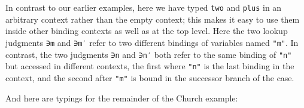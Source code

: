 \begin{fence}
\begin{code}
\AgdaSpace{}%
\AgdaSymbol{(}\AgdaSpace{}%
\AgdaSymbol{(}\AgdaSpace{}%
\AgdaSymbol{))}\<%
\\
%
\>[2]%
\>[6]\AgdaSymbol{=}\AgdaSpace{}%
\AgdaSpace{}%
\<%
\\
%
\>[2]%
\>[6]\AgdaSymbol{=}\AgdaSpace{}%
\<%
\\
%
\>[2]\AgdaSpace{}%
\AgdaSymbol{=}\AgdaSpace{}%
\<%
\\
%
\>[2]\AgdaSpace{}%
\AgdaSymbol{=}\AgdaSpace{}%
\AgdaSpace{}%
\<%
\\
%
\\[\AgdaEmptyExtraSkip]%
\>[0]\AgdaSpace{}%
\AgdaSymbol{:}\AgdaSpace{}%
\AgdaSpace{}%
\AgdaSpace{}%
\AgdaSpace{}%
\AgdaSpace{}%
\AgdaSpace{}%
\AgdaSpace{}%
\AgdaSpace{}%
\AgdaSpace{}%
\<%
\\
\>[0]\AgdaSpace{}%
\AgdaSymbol{=}\AgdaSpace{}%
\AgdaSpace{}%
\AgdaSpace{}%
\AgdaSpace{}%
\AgdaSpace{}%
\<%
\end{code}
\end{fence}

In contrast to our earlier examples, here we have typed \texttt{two} and
\texttt{plus} in an arbitrary context rather than the empty context;
this makes it easy to use them inside other binding contexts as well as
at the top level. Here the two lookup judgments \texttt{∋m} and
\texttt{∋m′} refer to two different bindings of variables named
\texttt{"m"}. In contrast, the two judgments \texttt{∋n} and
\texttt{∋n′} both refer to the same binding of \texttt{"n"} but accessed
in different contexts, the first where \texttt{"n"} is the last binding
in the context, and the second after \texttt{"m"} is bound in the
successor branch of the case.

And here are typings for the remainder of the Church example:

